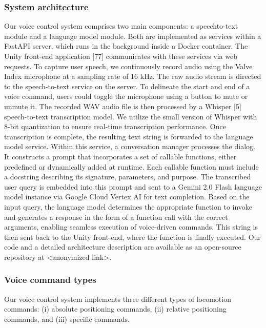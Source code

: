 \documentclass[preprint,12pt]{elsarticle}
\newcommand{\reftext}[1]{{\color{gray}#1}}   %
\begin{document}
\subsubsection{System architecture}
\reftext{Our voice control system comprises two main components: a speechto-text module and a language model module. Both are implemented as services within a FastAPI server, which runs in the background inside a Docker container. The Unity front-end application [77] communicates with these services via web requests. To capture user speech, we continuously record audio using the Valve Index microphone at a sampling rate of 16 kHz. The raw audio stream is directed to the speech-to-text service on the server. To delineate the start and end of a voice command, users could toggle the microphone using a button to mute or unmute it. The recorded WAV audio file is then processed by a Whisper [5] speech-to-text transcription model. We utilize the small version of Whisper with 8-bit quantization to ensure real-time transcription performance. Once transcription is complete, the resulting text string is forwarded to the language model service. Within this service, a conversation manager processes the dialog. It constructs a prompt that incorporates a set of callable functions, either predefined or dynamically added at runtime. Each callable function must include a docstring describing its signature, parameters, and purpose. The transcribed user query is embedded into this prompt and sent to a Gemini 2.0 Flash language model instance via Google Cloud Vertex AI for text completion. Based on the input query, the language model determines the appropriate function to invoke and generates a response in the form of a function call with the correct arguments, enabling seamless execution of voice-driven commands. This string is then sent back to the Unity front-end, where the function is finally executed. Our code and a detailed architecture description are available as an open-source repository at <anonymized link>.}

\subsubsection{Voice command types}
\reftext{Our voice control system implements three different types of locomotion commands: (i) absolute positioning commands, (ii) relative positioning commands, and (iii) specific commands.}
\end{document}
